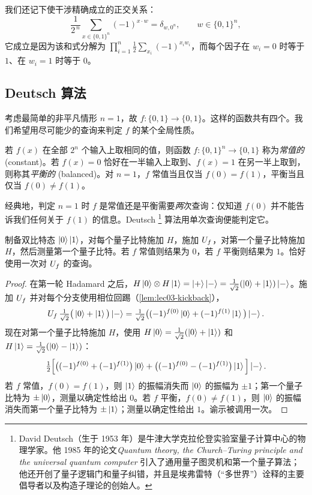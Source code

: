 我们还记下使干涉精确成立的正交关系：
\begin{equation}
  \frac{1}{2^{\,n}}\sum_{x\in\{0,1\}^n}(-1)^{x\cdot w}
  =\delta_{w,0^n},
  \qquad w\in\{0,1\}^n,
  \label{eq:lec03-orthog}
\end{equation}
它成立是因为该和式分解为 $\prod_{i=1}^{n}\tfrac12\sum_{x_i}(-1)^{x_i w_i}$，而每个因子在 $w_i=0$ 时等于 $1$、在 $w_i=1$ 时等于 $0$。

\subsection{Deutsch 算法}

考虑最简单的非平凡情形 $n=1$，故 $f:\{0,1\}\to\{0,1\}$。这样的函数共有四个。我们希望用尽可能少的查询来判定 $f$ 的某个全局性质。

\begin{definition}[常值函数与平衡函数]
\label{def:lec03-constbal}
若 $f(x)$ 在全部 $2^n$ 个输入上取相同的值，则函数 $f:\{0,1\}^n\to\{0,1\}$ 称为\emph{常值的} (constant)。若 $f(x)=0$ 恰好在一半输入上取到、$f(x)=1$ 在另一半上取到，则称其\emph{平衡的} (balanced)。对 $n=1$，$f$ 常值当且仅当 $f(0)=f(1)$，平衡当且仅当 $f(0)\neq f(1)$。
\end{definition}

经典地，判定 $n=1$ 时 $f$ 是常值还是平衡需要\emph{两}次查询：仅知道 $f(0)$ 并不能告诉我们任何关于 $f(1)$ 的信息。Deutsch%
\footnote{David Deutsch（生于 1953 年）是牛津大学克拉伦登实验室量子计算中心的物理学家。他 1985 年的论文\emph{Quantum theory, the Church--Turing principle and the universal quantum computer} 引入了通用量子图灵机和第一个量子算法；他还开创了量子逻辑门和量子纠错，并且是埃弗雷特（“多世界”）诠释的主要倡导者以及构造子理论的创始人。}
算法用单次查询便能判定它。

\begin{theorem}
\label{thm:lec03-deutsch}
制备双比特态 $\ket{0}\ket{1}$，对每个量子比特施加 $H$，施加 $U_{f}$，对第一个量子比特施加 $H$，然后测量第一个量子比特。若 $f$ 常值则结果为 $0$，若 $f$ 平衡则结果为 $1$。恰好使用一次对 $U_{f}$ 的查询。
\end{theorem}

\begin{proof}
在第一轮 Hadamard 之后，$H\ket{0}\otimes H\ket{1}=\ket{+}\ket{-}=\tfrac{1}{\sqrt2}(\ket{0}+\ket{1})\ket{-}$。施加 $U_{f}$ 并对每个分支使用相位回踢（\cref{lem:lec03-kickback}），
\[
  U_{f}\,\tfrac{1}{\sqrt2}\big(\ket{0}+\ket{1}\big)\ket{-}
  =\tfrac{1}{\sqrt2}\big((-1)^{f(0)}\ket{0}+(-1)^{f(1)}\ket{1}\big)\ket{-}.
\]
现在对第一个量子比特施加 $H$，使用 $H\ket{0}=\tfrac{1}{\sqrt2}(\ket0+\ket1)$ 和 $H\ket{1}=\tfrac{1}{\sqrt2}(\ket0-\ket1)$：
\[
  \tfrac{1}{2}\Big[\big((-1)^{f(0)}+(-1)^{f(1)}\big)\ket{0}
  +\big((-1)^{f(0)}-(-1)^{f(1)}\big)\ket{1}\Big]\ket{-}.
\]
若 $f$ 常值，$f(0)=f(1)$，则 $\ket{1}$ 的振幅消失而 $\ket{0}$ 的振幅为 $\pm1$；第一个量子比特为 $\pm\ket{0}$，测量以确定性给出 $0$。若 $f$ 平衡，$f(0)\neq f(1)$，则 $\ket{0}$ 的振幅消失而第一个量子比特为 $\pm\ket{1}$；测量以确定性给出 $1$。谕示被调用一次。
\end{proof}

